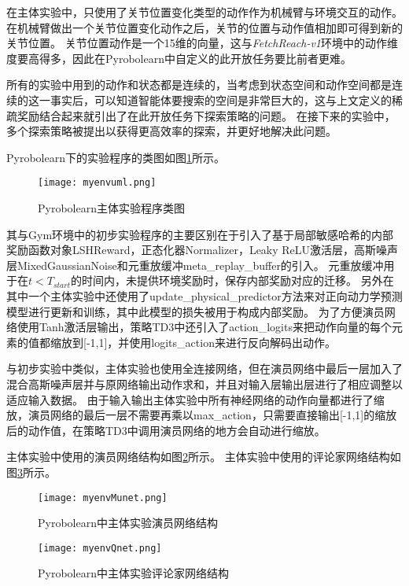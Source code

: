 在主体实验中，只使用了关节位置变化类型的动作作为机械臂与环境交互的动作。
在机械臂做出一个关节位置变化动作之后，关节的位置与动作值相加即可得到新的关节位置。
关节位置动作是一个15维的向量，这与\emph{FetchReach-v1}环境中的动作维度要高得多，因此在Pyrobolearn中自定义的此开放任务要比前者更难。

所有的实验中用到的动作和状态都是连续的，当考虑到状态空间和动作空间都是连续的这一事实后，可以知道智能体要搜索的空间是非常巨大的，这与上文定义的稀疏奖励结合起来就引出了在此开放任务下探索策略的问题。
在接下来的实验中，多个探索策略被提出以获得更高效率的探索，并更好地解决此问题。

Pyrobolearn下的实验程序的类图如图\ref{myenvuml}所示。
    \begin{figure}[htpb]
        \centering
        \texttt{[image: myenvuml.png]}
        \caption{Pyrobolearn主体实验程序类图}
        \label{myenvuml}
    \end{figure}
    其与Gym环境中的初步实验程序的主要区别在于引入了基于局部敏感哈希的内部奖励函数对象LSHReward，正态化器Normalizer\cite{DBLP:journals/corr/HasseltGHS16}，Leaky ReLU激活层\cite{DBLP:journals/corr/XuWCL15}，高斯噪声层MixedGaussianNoise和元重放缓冲meta\_replay\_buffer的引入。
    元重放缓冲用于在$t<T_{start}$的时间内，未提供环境奖励时，保存内部奖励对应的迁移。
    另外在其中一个主体实验中还使用了update\_physical\_predictor方法来对正向动力学预测模型进行更新和训练，其中此模型的损失被用于构成内部奖励。
    为了方便演员网络使用Tanh激活层\cite{DBLP:journals/corr/abs-1811-03378}输出，策略TD3中还引入了action\_logits来把动作向量的每个元素的值都缩放到[-1,1]，并使用logits\_action来进行反向解码出动作。

    与初步实验中类似，主体实验也使用全连接网络\cite{1165576,novikoff62convergence}，但在演员网络中最后一层加入了混合高斯噪声层并与原网络输出动作求和，并且对输入层输出层进行了相应调整以适应输入数据。
    由于输入输出主体实验中所有神经网络的动作向量都进行了缩放，演员网络的最后一层不需要再乘以max\_action，只需要直接输出[-1,1]的缩放后的动作值，在策略TD3中调用演员网络的地方会自动进行缩放。

    主体实验中使用的演员网络结构如图\ref{myenvMunet}所示。
    主体实验中使用的评论家网络结构如图\ref{myenvQnet}所示。
    \begin{figure}[htpb]
        \centering
        \texttt{[image: myenvMunet.png]}
        \caption{Pyrobolearn中主体实验演员网络结构}
        \label{myenvMunet}
    \end{figure}

    \begin{figure}[htpb]
        \centering
        \texttt{[image: myenvQnet.png]}
        \caption{Pyrobolearn中主体实验评论家网络结构}
        \label{myenvQnet}
    \end{figure}
